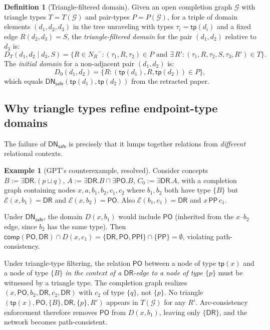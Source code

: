 \documentclass[a4paper,11pt]{article}
\theoremstyle{definition}
\newtheorem{definition}[theorem]{Definition}
\newtheorem{example}[theorem]{Example}
\newcommand{\NR}{\ensuremath{N_R}}
\newcommand{\DR}{\ensuremath{\mathsf{DR}}}
\newcommand{\PO}{\ensuremath{\mathsf{PO}}}
\newcommand{\PP}{\ensuremath{\mathsf{PP}}}
\newcommand{\PPI}{\ensuremath{\mathsf{PPI}}}
\newcommand{\comp}{\ensuremath{\mathsf{comp}}}
\newcommand{\DN}{\ensuremath{\mathsf{DN}}}
\begin{document}
\begin{definition}[Triangle-filtered domain]
\label{def:triangle-domain}
Given an open completion graph $\mathcal{G}$ with triangle types
$T = T(\mathcal{G})$ and pair-types $P = P(\mathcal{G})$, for a
triple of domain elements $(d_1, d_2, d_3)$ in the tree unraveling
with types $\tau_i = \mathsf{tp}(d_i)$ and a fixed edge
$R(d_2, d_3) = S$, the \emph{triangle-filtered domain} for the
pair $(d_1, d_2)$ relative to $d_3$ is:
\[
  D_T(d_1, d_2 \mid d_3, S) = \bigl\{
    R \in \NR^{-} :
    (\tau_1, R, \tau_2) \in P \text{ and }
    \exists\, R'\!: (\tau_1, R, \tau_2, S, \tau_3, R') \in T
  \bigr\}.
\]
The \emph{initial domain} for a non-adjacent pair $(d_1, d_2)$ is:
\begin{equation}
\label{eq:initial-domain}
  D_0(d_1, d_2) = \bigl\{
    R : (\mathsf{tp}(d_1), R, \mathsf{tp}(d_2)) \in P
  \bigr\},
\end{equation}
which equals $\DN_{\mathsf{safe}}(\mathsf{tp}(d_1), \mathsf{tp}(d_2))$
from the retracted paper.
\end{definition}

\subsection{Why triangle types refine endpoint-type domains}

The failure of $\DN_{\mathsf{safe}}$ is precisely that it lumps
together relations from \emph{different} relational contexts.

\begin{example}[GPT's counterexample, resolved]
\label{ex:gpt-counterexample}
Consider concepts $B := \exists \DR.(p \sqcup q)$,
$A := \exists \DR.B \sqcap \exists \PO.B$, $C_0 := \exists \DR.A$,
with a completion graph containing nodes $x, a, b_1, b_2, c_1, c_2$
where $b_1, b_2$ both have type $\{B\}$ but
$\mathcal{E}(x, b_1) = \DR$ and $\mathcal{E}(x, b_2) = \PO$.
Also $\mathcal{E}(b_1, c_1) = \DR$ and $x\,\PP\,c_1$.

Under $\DN_{\mathsf{safe}}$, the domain $D(x, b_1)$ would include
$\PO$ (inherited from the $x$--$b_2$ edge, since $b_2$ has the same
type).  Then $\comp(\PO, \DR) \cap D(x, c_1) = \{\DR,\PO,\PPI\} \cap
\{\PP\} = \emptyset$, violating path-consistency.

Under triangle-type filtering, the relation $\PO$ between a node of
type $\mathsf{tp}(x)$ and a node of type $\{B\}$ \emph{in the
context of a $\DR$-edge to a node of type $\{p\}$} must be witnessed
by a triangle type.  The completion graph realizes
$(x, \PO, b_2, \DR, c_2, \DR)$ with $c_2$ of type $\{q\}$, not
$\{p\}$.  No triangle
$(\mathsf{tp}(x), \PO, \{B\}, \DR, \{p\}, R')$ appears in
$T(\mathcal{G})$ for any $R'$.  Arc-consistency enforcement therefore
removes $\PO$ from $D(x, b_1)$, leaving only $\{\DR\}$, and the
network becomes path-consistent.
\end{example}
\end{document}
